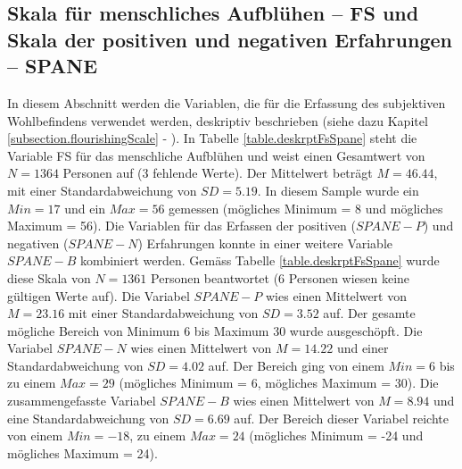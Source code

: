 \subsection{Skala für menschliches Aufblühen -- FS und Skala der positiven und negativen Erfahrungen -- SPANE}
In diesem Abschnitt werden die Variablen, die für die Erfassung des subjektiven Wohlbefindens verwendet werden, deskriptiv beschrieben (siehe dazu Kapitel \ref{subsection.flourishingScale} - ). In Tabelle \ref{table.deskrptFsSpane} steht die Variable FS für das menschliche Aufblühen und weist einen Gesamtwert von $N = 1364$ Personen auf (3 fehlende Werte). Der Mittelwert beträgt $M = 46.44$, mit einer Standardabweichung von $SD = 5.19$. In diesem Sample wurde ein $Min = 17$ und ein $Max = 56$ gemessen (mögliches Minimum = 8 und mögliches Maximum = 56). Die Variablen für das Erfassen der positiven ($SPANE-P$) und negativen ($SPANE-N$) Erfahrungen konnte in einer weitere Variable $SPANE-B$ kombiniert werden. Gemäss Tabelle \ref{table.deskrptFsSpane} wurde diese Skala von $N = 1361$ Personen beantwortet (6 Personen wiesen keine gültigen Werte auf). Die Variabel $SPANE-P$ wies einen Mittelwert von $M = 23.16$ mit einer Standardabweichung von $SD = 3.52$ auf. Der gesamte mögliche Bereich von Minimum 6 bis Maximum 30 wurde ausgeschöpft. Die Variabel $SPANE-N$ wies einen Mittelwert von $M=14.22$ und einer Standardabweichung von $SD=4.02$ auf. Der Bereich ging von einem $Min = 6$ bis zu einem $Max = 29$ (mögliches Minimum = 6, mögliches Maximum = 30). Die zusammengefasste Variabel $SPANE-B$ wies einen Mittelwert von $M = 8.94$ und eine Standardabweichung von $SD = 6.69$ auf. Der Bereich dieser Variabel reichte von einem $Min = -18$, zu einem $Max = 24$ (mögliches Minimum = -24 und mögliches Maximum = 24).
